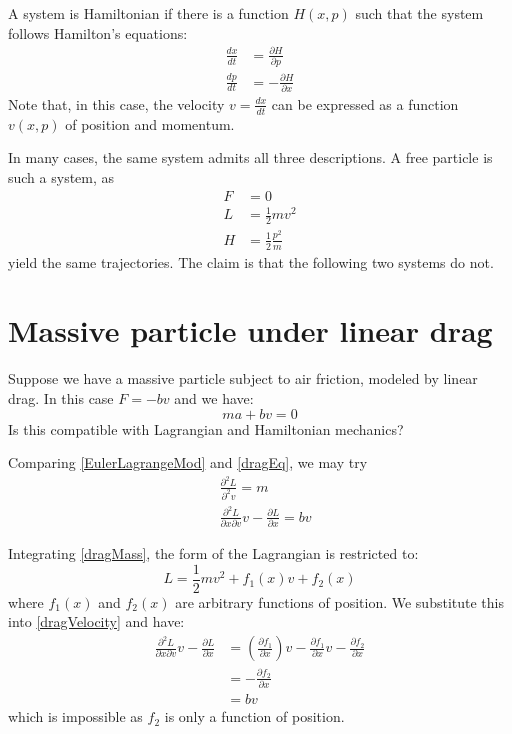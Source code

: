 \documentclass[11pt]{article}
\begin{document}
A system is Hamiltonian if there is a function $H(x,p)$ such that the system follows Hamilton's equations:
\begin{equation}
\begin{aligned}
\frac{dx}{dt} &= \frac{\partial H}{\partial p} \\
\frac{dp}{dt} &= - \frac{\partial H}{\partial x}
\end{aligned}
\label{Hamilton}
\end{equation}
Note that, in this case, the velocity $v=\frac{dx}{dt}$ can be expressed as a function $v(x,p)$ of position and momentum.

In many cases, the same system admits all three descriptions. A free particle is such a system, as
\begin{equation}
\begin{aligned}
F&=0 \\
L&=\frac{1}{2}mv^2 \\
H&=\frac{1}{2}\frac{p^2}{m}
\end{aligned}
\end{equation}
yield the same trajectories. The claim is that the following two systems do not.

\section{Massive particle under linear drag}

Suppose we have a massive particle subject to air friction, modeled by linear drag. In this case $F=-bv$ and we have:
\begin{equation}
\label{dragEq}
ma+bv=0
\end{equation}
Is this compatible with Lagrangian and Hamiltonian mechanics?

Comparing \eqref{EulerLagrangeMod} and \eqref{dragEq}, we may try
\begin{align}
\label{dragMass}
&\frac{\partial^2 L}{\partial^2 v} = m \\
\label{dragVelocity}
&\frac{\partial^2 L}{\partial x \partial v} v - \frac{\partial L}{\partial x} = bv
\end{align}

Integrating \eqref{dragMass}, the form of the Lagrangian is restricted to:
\begin{equation*}
L = \frac{1}{2} m v^2 + f_1(x) v + f_2 (x)
\end{equation*}
where $f_1(x)$ and $f_2 (x)$ are arbitrary functions of position. We substitute this into \eqref{dragVelocity} and have:
\begin{align*}
\frac{\partial^2 L}{\partial x \partial v} v - \frac{\partial L}{\partial x} &= \left(\frac{\partial f_1}{\partial x}\right) v - \frac{\partial f_1}{\partial x} v -  \frac{\partial f_2}{\partial x} \\
&= -  \frac{\partial f_2}{\partial x} \\
&= bv
\end{align*}
which is impossible as $f_2$ is only a function of position.
\end{document}
